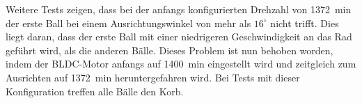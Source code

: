 \noindent
Weitere Tests zeigen, dass bei der anfangs konfigurierten Drehzahl von 
1372\si{\per\minute} der erste Ball bei einem Ausrichtungswinkel von mehr als 
$16^\circ$ nicht trifft. Dies liegt daran, dass der erste Ball mit einer 
niedrigeren Geschwindigkeit an das Rad geführt wird, als die anderen Bälle. 
Dieses Problem ist nun behoben worden, indem der BLDC-Motor anfangs auf 
1400\si{\per\minute} eingestellt wird und zeitgleich zum Ausrichten auf 
1372\si{\per\minute} heruntergefahren wird. Bei Tests mit dieser Konfiguration 
treffen alle Bälle den Korb.
